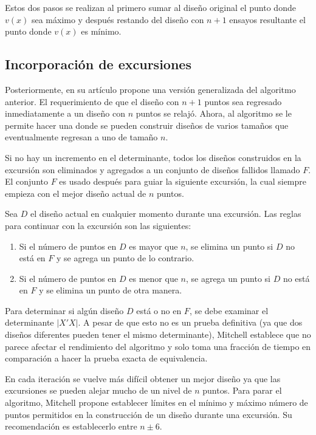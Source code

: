 Estos dos pasos se realizan al primero sumar al diseño original el punto donde $v(x)$ sea máximo y después restando del diseño con $n+1$ ensayos resultante el punto donde $v(x)$ es mínimo.

\subsection{Incorporación de excursiones}

Posteriormente, en su artículo \cite{mitchelldetmax} propone una versión generalizada del algoritmo anterior. El requerimiento de que el diseño con $n+1$ puntos sea regresado inmediatamente a un diseño con $n$ puntos se relajó. Ahora, al algoritmo se le permite hacer una  donde se pueden construir diseños de varios tamaños que eventualmente regresan a uno de tamaño $n$.  

Si no hay un incremento en el determinante, todos los diseños construidos en la excursión son eliminados y agregados a un conjunto de diseños fallidos llamado $F$. El conjunto $F$ es usado después para guiar la siguiente excursión, la cual siempre empieza con el mejor diseño actual de $n$ puntos. 

Sea $D$ el diseño actual en cualquier momento durante una excursión. Las reglas para continuar con la excursión son las siguientes:

\begin{enumerate}
	\item Si el número de puntos en $D$ es mayor que $n$, se elimina un punto si $D$ no está en $F$ y se agrega un punto de lo contrario. 
	
	\item Si el número de puntos en $D$ es menor que $n$, se agrega un punto si $D$ no está en $F$ y se elimina un punto de otra manera. 
\end{enumerate}

Para determinar si algún diseño $D$ está o no en $F$, se debe examinar el determinante $|X'X|$. A pesar de que esto no es un prueba definitiva (ya que dos diseños diferentes pueden tener el mismo determinante), Mitchell establece que no parece afectar el rendimiento del algoritmo y solo toma una fracción de tiempo en comparación a hacer la prueba exacta de equivalencia.

En cada iteración se vuelve más difícil obtener un mejor diseño ya que las excursiones se pueden alejar mucho de un nivel de $n$ puntos. Para parar el algoritmo, Mitchell propone establecer límites en el mínimo y máximo número de puntos permitidos en la construcción de un diseño durante una excursión. Su recomendación es establecerlo entre $n \pm 6$. 

